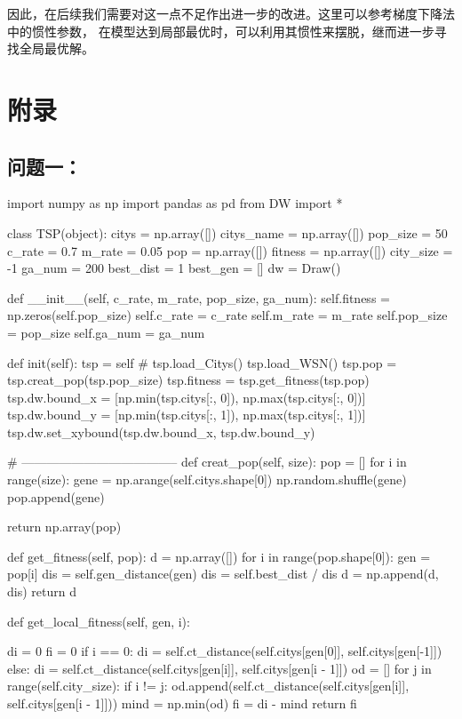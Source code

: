 \documentclass{ctexart}
\begin{document}
    因此，在后续我们需要对这一点不足作出进一步的改进。这里可以参考梯度下降法中的惯性参数，
    在模型达到局部最优时，可以利用其惯性来摆脱，继而进一步寻找全局最优解。

    \section*{附录}
    \subsection*{问题一：}
    \begin{python}
import numpy as np
import pandas as pd
from DW import *

class TSP(object):
    citys = np.array([])
    citys_name = np.array([])
    pop_size = 50
    c_rate = 0.7
    m_rate = 0.05
    pop = np.array([])
    fitness = np.array([])
    city_size = -1
    ga_num = 200
    best_dist = 1
    best_gen = []
    dw = Draw()

    def __init__(self, c_rate, m_rate, pop_size, ga_num):
        self.fitness = np.zeros(self.pop_size)
        self.c_rate = c_rate
        self.m_rate = m_rate
        self.pop_size = pop_size
        self.ga_num = ga_num

    def init(self):
        tsp = self
        # tsp.load_Citys()
        tsp.load_WSN()
        tsp.pop = tsp.creat_pop(tsp.pop_size)
        tsp.fitness = tsp.get_fitness(tsp.pop)
        tsp.dw.bound_x = [np.min(tsp.citys[:, 0]), np.max(tsp.citys[:, 0])]
        tsp.dw.bound_y = [np.min(tsp.citys[:, 1]), np.max(tsp.citys[:, 1])]
        tsp.dw.set_xybound(tsp.dw.bound_x, tsp.dw.bound_y)

    # --------------------------------------
    def creat_pop(self, size):
        pop = []
        for i in range(size):
            gene = np.arange(self.citys.shape[0])
            np.random.shuffle(gene)
            pop.append(gene)

        return np.array(pop)

    def get_fitness(self, pop):
        d = np.array([])
        for i in range(pop.shape[0]):
            gen = pop[i]  
            dis = self.gen_distance(gen)
            dis = self.best_dist / dis
            d = np.append(d, dis)
        return d

    def get_local_fitness(self, gen, i):
 
        di = 0
        fi = 0
        if i == 0:
            di = self.ct_distance(self.citys[gen[0]], self.citys[gen[-1]])
        else:
            di = self.ct_distance(self.citys[gen[i]], self.citys[gen[i - 1]])
        od = []
        for j in range(self.city_size):
            if i != j:
                od.append(self.ct_distance(self.citys[gen[i]], self.citys[gen[i - 1]]))
        mind = np.min(od)
        fi = di - mind
        return fi


\end{python}
\end{document}
